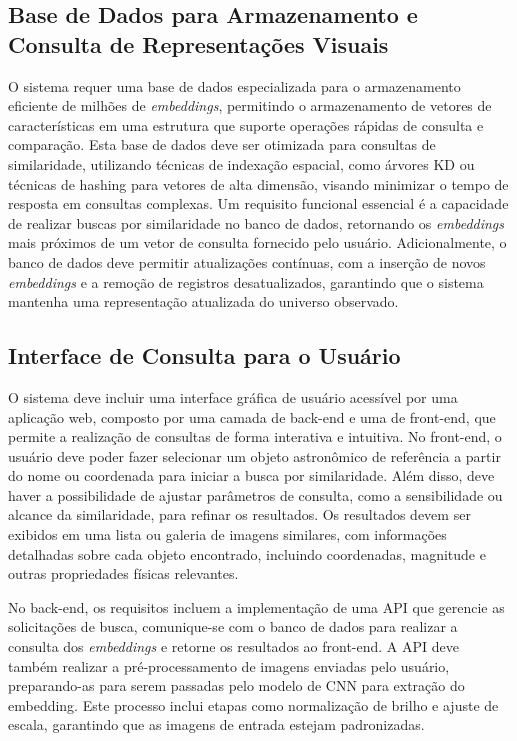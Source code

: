 \subsection{Base de Dados para Armazenamento e Consulta de Representações Visuais}
\label{sec:req-db}

O sistema requer uma base de dados especializada para o armazenamento eficiente de milhões de \emph{embeddings}, permitindo o armazenamento de vetores de características em uma estrutura que suporte operações rápidas de consulta e comparação. Esta base de dados deve ser otimizada para consultas de similaridade, utilizando técnicas de indexação espacial, como árvores KD ou técnicas de hashing para vetores de alta dimensão, visando minimizar o tempo de resposta em consultas complexas. Um requisito funcional essencial é a capacidade de realizar buscas por similaridade no banco de dados, retornando os \emph{embeddings} mais próximos de um vetor de consulta fornecido pelo usuário. Adicionalmente, o banco de dados deve permitir atualizações contínuas, com a inserção de novos \emph{embeddings} e a remoção de registros desatualizados, garantindo que o sistema mantenha uma representação atualizada do universo observado.






\subsection{Interface de Consulta para o Usuário}
\label{sec:req-webapp}

O sistema deve incluir uma interface gráfica de usuário acessível por uma aplicação web, composto por uma camada de back-end e uma de front-end, que permite a realização de consultas de forma interativa e intuitiva. No front-end, o usuário deve poder fazer  selecionar um objeto astronômico de referência a partir do nome ou coordenada para iniciar a busca por similaridade. Além disso, deve haver a possibilidade de ajustar parâmetros de consulta, como a sensibilidade ou alcance da similaridade, para refinar os resultados. Os resultados devem ser exibidos em uma lista ou galeria de imagens similares, com informações detalhadas sobre cada objeto encontrado, incluindo coordenadas, magnitude e outras propriedades físicas relevantes.

No back-end, os requisitos incluem a implementação de uma API que gerencie as solicitações de busca, comunique-se com o banco de dados para realizar a consulta dos \emph{embeddings} e retorne os resultados ao front-end. A API deve também realizar a pré-processamento de imagens enviadas pelo usuário, preparando-as para serem passadas pelo modelo de CNN para extração do embedding. Este processo inclui etapas como normalização de brilho e ajuste de escala, garantindo que as imagens de entrada estejam padronizadas.






